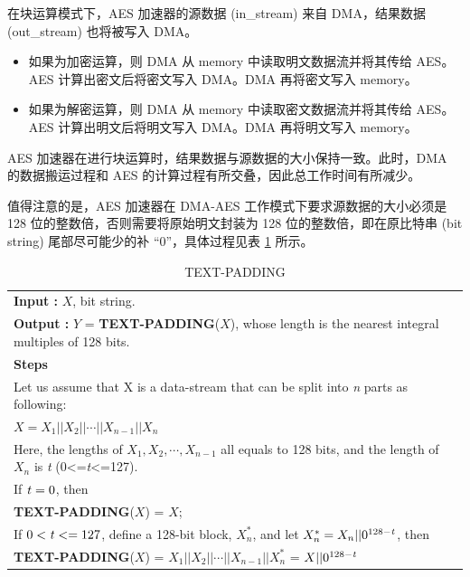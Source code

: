 \documentclass[main\_\_CN.tex]{subfiles}
\begin{document}
在块运算模式下，AES 加速器的源数据 (in\_stream) 来自 DMA，结果数据 (out\_stream) 也将被写入 DMA。
\begin{itemize}
    \item 如果为加密运算，则 DMA 从 memory 中读取明文数据流并将其传给 AES。AES 计算出密文后将密文写入 DMA。DMA 再将密文写入 memory。
    \item 如果为解密运算，则 DMA 从 memory 中读取密文数据流并将其传给 AES。AES 计算出明文后将明文写入 DMA。DMA 再将明文写入 memory。
\end{itemize}

AES 加速器在进行块运算时，结果数据与源数据的大小保持一致。此时，DMA 的数据搬运过程和 AES 的计算过程有所交叠，因此总工作时间有所减少。

\label{api:testpadding}值得注意的是，AES 加速器在 DMA-AES 工作模式下要求源数据的大小必须是 128 位的整数倍，否则需要将原始明文封装为 128 位的整数倍，即在原比特串 (bit string) 尾部尽可能少的补 “0”，具体过程见表 \ref{table:DefineFunctionTextPadding} 所示。


\begin{longtable}[c]{|p{15cm}|}
\caption{TEXT-PADDING}
\label{table:DefineFunctionTextPadding}\\
\hline
\rowcolor{lightgray}
\multirow{1}{*}{%
{\bfseries Function :} {\bfseries TEXT-PADDING}(\ ) } \\\hline
{\bfseries Input\phantom{aaa} :} $X$, bit string.\\
{\bfseries Output\phantom{a~} :} $Y$ = {\bfseries TEXT-PADDING}($X$), whose length is the nearest integral multiples of 128 bits. \\\hline
{\bfseries Steps\phantom{aa~}  }\\
\hspace{1.3cm} Let us assume that X is a data-stream that can be split into {\it{n}} parts as following: \\
\phantom{aaaaaaaa}$X = X_{1} || X_{2} || \cdots || X_{n-1} || X_{n}$ \\
\phantom{aaaaaaaa}Here, the lengths of $X_{1}, X_{2}, \cdots, X_{n-1}$ all equals to 128 bits, and the length of $X_{n}$ is {\it{t}} (0<={\it{t}}<=127).\\
\phantom{aaaaaaaa}If ${\it{t}} = 0$, then\\
\phantom{aaaaaaaa}\phantom{空空空空空} {\bfseries TEXT-PADDING}($X$) = $X$;\\
\phantom{aaaaaaaa}If $0<{\it{t}} <= 127$, define a 128-bit block, $X_{n}^{*}$, and let $X_{n}^{*} = X_{n} || 0^{128-{\it{t}}}$, then\\
\phantom{aaaaaaaa}\phantom{空空空空空} {\bfseries TEXT-PADDING}($X$) = $X_{1} || X_{2} || \cdots || X_{n-1} || X_{n}^{*}$  = $X || 0^{128-{\it{t}}}$\\
\hline
\end{longtable}
\end{document}
